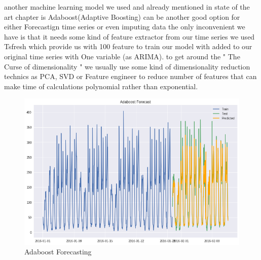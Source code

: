 another machine learning model we used and already mentioned in state of the art chapter is Adaboost(Adaptive Boosting) can be another good option for either Forecastign time series or even imputing data the only inconvenient we have is that it needs some kind of feature extractor from our time series we used Tsfresh \cite{tsfresh} which provide us with 100 feature to train our model with added to our original time series with One variable (as ARIMA).
to get around the " The Curse of dimensionality " we usually use some kind of dimensionality  reduction technics as PCA, SVD or Feature engineer to reduce number of features that can make time of calculations polynomial rather than exponential.
\begin{figure}[!h]
\centering
\includegraphics[scale=.6]{img/adaboost_results.png}  
\caption{Adaboost Forecasting}
\label{fig:adaboost}
\end{figure}

